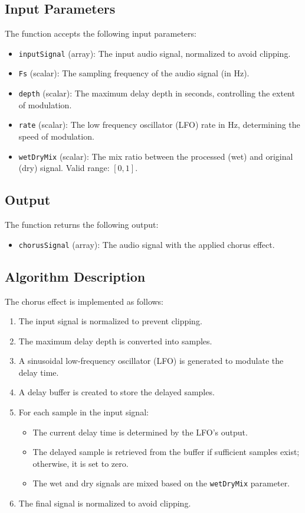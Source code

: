 \documentclass{article}
\begin{document}
\subsection{Input Parameters}
The function accepts the following input parameters:
\begin{itemize}
    \item \texttt{inputSignal} (array): The input audio signal, normalized to avoid clipping.
    \item \texttt{Fs} (scalar): The sampling frequency of the audio signal (in Hz).
    \item \texttt{depth} (scalar): The maximum delay depth in seconds, controlling the extent of modulation.
    \item \texttt{rate} (scalar): The low frequency oscillator (LFO) rate in Hz, determining the speed of modulation.
    \item \texttt{wetDryMix} (scalar): The mix ratio between the processed (wet) and original (dry) signal. Valid range: $[0, 1]$.
\end{itemize}

\subsection{Output}
The function returns the following output:
\begin{itemize}
    \item \texttt{chorusSignal} (array): The audio signal with the applied chorus effect.
\end{itemize}

\subsection{Algorithm Description}
The chorus effect is implemented as follows:
\begin{enumerate}
    \item The input signal is normalized to prevent clipping.
    \item The maximum delay depth is converted into samples.
    \item A sinusoidal low-frequency oscillator (LFO) is generated to modulate the delay time.
    \item A delay buffer is created to store the delayed samples.
    \item For each sample in the input signal:
    \begin{itemize}
        \item The current delay time is determined by the LFO's output.
        \item The delayed sample is retrieved from the buffer if sufficient samples exist; otherwise, it is set to zero.
        \item The wet and dry signals are mixed based on the \texttt{wetDryMix} parameter.
    \end{itemize}
    \item The final signal is normalized to avoid clipping.
\end{enumerate}
\end{document}
